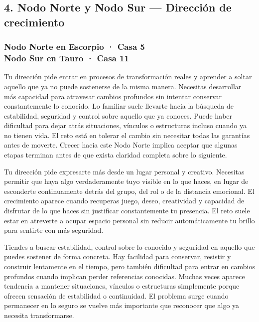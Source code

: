\documentclass[11pt,a4paper]{article}
\begin{document}
\vspace{0.5cm}


\subsection{4. Nodo Norte y Nodo Sur — Dirección de crecimiento}

\subsubsection*{Nodo Norte en Escorpio · Casa 5 \\
Nodo Sur en Tauro · Casa 11}

Tu dirección pide entrar en procesos de transformación reales y aprender a soltar aquello que ya no puede sostenerse de la misma manera. Necesitas desarrollar más capacidad para atravesar cambios profundos sin intentar conservar constantemente lo conocido. Lo familiar suele llevarte hacia la búsqueda de estabilidad, seguridad y control sobre aquello que ya conoces. Puede haber dificultad para dejar atrás situaciones, vínculos o estructuras incluso cuando ya no tienen vida. El reto está en tolerar el cambio sin necesitar todas las garantías antes de moverte. Crecer hacia este Nodo Norte implica aceptar que algunas etapas terminan antes de que exista claridad completa sobre lo siguiente.

Tu dirección pide expresarte más desde un lugar personal y creativo. Necesitas permitir que haya algo verdaderamente tuyo visible en lo que haces, en lugar de esconderte continuamente detrás del grupo, del rol o de la distancia emocional. El crecimiento aparece cuando recuperas juego, deseo, creatividad y capacidad de disfrutar de lo que haces sin justificar constantemente tu presencia. El reto suele estar en atreverte a ocupar espacio personal sin reducir automáticamente tu brillo para sentirte con más seguridad.

Tiendes a buscar estabilidad, control sobre lo conocido y seguridad en aquello que puedes sostener de forma concreta. Hay facilidad para conservar, resistir y construir lentamente en el tiempo, pero también dificultad para entrar en cambios profundos cuando implican perder referencias conocidas. Muchas veces aparece tendencia a mantener situaciones, vínculos o estructuras simplemente porque ofrecen sensación de estabilidad o continuidad. El problema surge cuando permanecer en lo seguro se vuelve más importante que reconocer que algo ya necesita transformarse.
\end{document}
